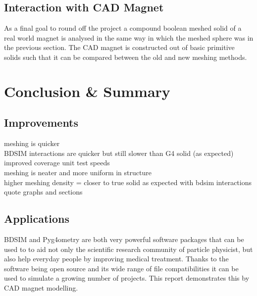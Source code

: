 \documentclass[12pt,a4paper]{article}
\begin{document}
\subsection{Interaction with CAD Magnet}
As a final goal to round off the project a compound boolean meshed solid of a real world magnet is analysed in the same way in which the meshed sphere was in the previous section. The CAD magnet is constructed out of basic primitive solids such that it can be compared between the old and new meshing methods.
\newpage
\section{Conclusion \& Summary}
\label{conc}

\subsection{Improvements}
meshing is quicker\\
BDSIM interactions are quicker but still slower than G4 solid (as expected)
improved coverage unit test speeds\\
meshing is neater and more uniform in structure\\
higher meshing density = closer to true solid as expected with bdsim interactions\\
quote graphs and sections\\

\subsection{Applications}
BDSIM and Pyg4ometry are both very powerful software packages that can be used to to aid not only the scientific research community of particle physicist, but also help everyday people by improving medical treatment. Thanks to the software being open source and its wide range of file compatibilities it can be used to simulate a growing number of projects. This report demonstrates this by CAD magnet modelling.

\end{document}
